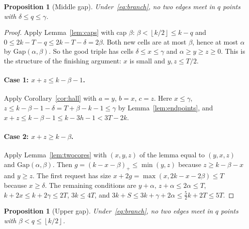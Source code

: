 \documentclass[11pt]{article}
\numberwithin{equation}{section}
\newtheorem{proposition}[theorem]{Proposition}
\theoremstyle{definition}
\theoremstyle{remark}
\newcommand{\floor}[1]{\left\lfloor #1\right\rfloor}
\newcommand{\Gap}{\mathrm{Gap}}
\begin{document}
\begin{proposition}[Middle gap]\label{prop:gaptwo}
Under~\eqref{eq:branch}, no two edges meet in $q$ points with
$\delta\le q\le\gamma$.
\end{proposition}

\begin{proof}
Apply Lemma~\ref{lem:caps} with cap $\beta$: $\beta<\floor{k/2}\le k-q$
and $0\le2k-T-q\le2k-T-\delta=2\beta$. Both new cells are at most $\beta$,
hence at most $\alpha$ by $\Gap(\alpha,\beta)$. So the good triple has
cells $\delta\le x\le\gamma$ and $\alpha\ge y\ge z\ge0$. This is the
structure of the finishing argument: $x$ is small and $y,z\le T/2$.

\paragraph{Case 1: $x+z\le k-\beta-1$.} Apply Corollary~\ref{cor:hall}
with $a=y$, $b=x$, $c=z$. Here $x\le\gamma$,
$z\le k-\beta-1-\delta=T+\beta-k-1\le\gamma$ by
Lemma~\ref{lem:endpoints}, and $x+z\le k-\beta-1\le k-3h-1<3T-2k$.

\paragraph{Case 2: $x+z\ge k-\beta$.} Apply Lemma~\ref{lem:twocores} with
$(x,y,z)$ of the lemma equal to $(y,x,z)$ and $\Gap(\alpha,\beta)$. Then
$g=(k-x-\beta)_+\le\min(y,z)$ because $z\ge k-\beta-x$ and $y\ge z$. The
first request has size $x+2g=\max(x,2k-x-2\beta)\le T$ because
$x\ge\delta$. The remaining conditions are $y+\alpha,\,z+\alpha\le2\alpha\le T$,
$k+2x\le k+2\gamma\le2T$, $3k\le4T$, and
$3k+S\le3k+\gamma+2\alpha\le\tfrac52k+2T\le5T$.
\end{proof}

\begin{proposition}[Upper gap]\label{prop:gapthree}
Under~\eqref{eq:branch}, no two edges meet in $q$ points with
$\beta<q\le\floor{k/2}$.
\end{proposition}
\end{document}
